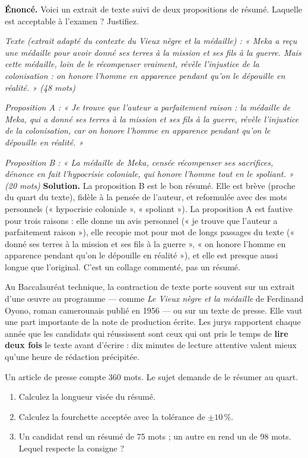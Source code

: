 \documentclass[11pt]{article}
\begin{document}
\begin{exoresolu}
\textbf{Énoncé.} Voici un extrait de texte suivi de deux propositions de résumé. Laquelle est acceptable à l'examen ? Justifiez.

\emph{Texte (extrait adapté du contexte du Vieux nègre et la médaille) : « Meka a reçu une médaille pour avoir donné ses terres à la mission et ses fils à la guerre. Mais cette médaille, loin de le récompenser vraiment, révèle l'injustice de la colonisation : on honore l'homme en apparence pendant qu'on le dépouille en réalité. » (48 mots)}

\emph{Proposition A : « Je trouve que l'auteur a parfaitement raison : la médaille de Meka, qui a donné ses terres à la mission et ses fils à la guerre, révèle l'injustice de la colonisation, car on honore l'homme en apparence pendant qu'on le dépouille en réalité. »}

\emph{Proposition B : « La médaille de Meka, censée récompenser ses sacrifices, dénonce en fait l'hypocrisie coloniale, qui honore l'homme tout en le spoliant. » (20 mots)}
\tcblower
\textbf{Solution.} La proposition B est le bon résumé. Elle est brève (proche du quart du texte), fidèle à la pensée de l'auteur, et reformulée avec des mots personnels (« hypocrisie coloniale », « spoliant »). La proposition A est fautive pour trois raisons : elle donne un avis personnel (« je trouve que l'auteur a parfaitement raison »), elle recopie mot pour mot de longs passages du texte (« donné ses terres à la mission et ses fils à la guerre », « on honore l'homme en apparence pendant qu'on le dépouille en réalité »), et elle est presque aussi longue que l'original. C'est un collage commenté, pas un résumé.
\end{exoresolu}

\begin{savaistu}
Au Baccalauréat technique, la contraction de texte porte souvent sur un extrait d'une œuvre au programme — comme \emph{Le Vieux nègre et la médaille} de Ferdinand Oyono, roman camerounais publié en 1956 — ou sur un texte de presse. Elle vaut une part importante de la note de production écrite. Les jurys rapportent chaque année que les candidats qui réussissent sont ceux qui ont pris le temps de \textbf{lire deux fois} le texte avant d'écrire : dix minutes de lecture attentive valent mieux qu'une heure de rédaction précipitée.
\end{savaistu}

\begin{exercice}
Un article de presse compte 360 mots. Le sujet demande de le résumer au quart.
\begin{enumerate}
\item Calculez la longueur visée du résumé.
\item Calculez la fourchette acceptée avec la tolérance de $\pm 10\,\%$.
\item Un candidat rend un résumé de 75 mots ; un autre en rend un de 98 mots. Lequel respecte la consigne ?
\end{enumerate}
\end{exercice}
\end{document}
